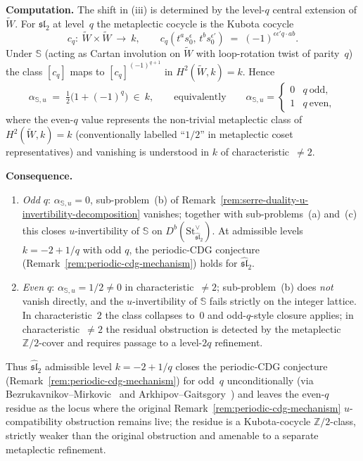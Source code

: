 \begin{proposition}
\medskip
\noindent\textbf{Computation.}
The shift in (iii) is determined by the level-$q$ central extension
of $\widetilde{W}$. For $\mathfrak{sl}_2$ at level~$q$ the metaplectic
cocycle is the Kubota cocycle~\cite{Kubota69}
\[
c_q \colon\ \widetilde{W}\times\widetilde{W}\ \longrightarrow\ k,\qquad
c_q(t^a s_0^\epsilon,\,t^b s_0^{\epsilon'}) \;=\;
(-1)^{\epsilon\epsilon' q\cdot ab}.
\]
Under $\mathbb{S}$ (acting as Cartan involution on $\widetilde{W}$
with loop-rotation twist of parity~$q$) the class $[c_q]$ maps to
$[c_q]^{(-1)^{q+1}}$ in $H^2(\widetilde{W},k) = k$. Hence
\[
\alpha_{\mathbb{S},u} \;=\; \tfrac{1}{2}\bigl(1 + (-1)^q\bigr)\ \in\ k,
\qquad\text{equivalently}\qquad
\alpha_{\mathbb{S},u} =
\begin{cases}
0 & q\ \text{odd},\\
1 & q\ \text{even},
\end{cases}
\]
where the even-$q$ value represents the non-trivial metaplectic
class of $H^2(\widetilde{W},k) = k$ (conventionally labelled
``$1/2$'' in metaplectic coset representatives) and vanishing is
understood in $k$ of characteristic~$\neq 2$.

\medskip
\noindent\textbf{Consequence.}
\begin{enumerate}[label=\textup{(\alph*)}]
\item \emph{Odd $q$}: $\alpha_{\mathbb{S},u} = 0$, sub-problem~(b) of
Remark~\textup{\ref{rem:serre-duality-u-invertibility-decomposition}}
vanishes; together with sub-problems~(a) and~(c) this closes
$u$-invertibility of $\mathbb{S}$ on
$D^b(\mathrm{St}^{\vee}_{\widehat{\mathfrak{sl}}_2})$. At admissible
levels $k = -2 + 1/q$ with odd $q$, the periodic-CDG conjecture (Remark~\ref{rem:periodic-cdg-mechanism})
holds for $\widehat{\mathfrak{sl}}_2$.
\item \emph{Even $q$}: $\alpha_{\mathbb{S},u} = 1/2\neq 0$ in
characteristic~$\neq 2$; sub-problem~(b) does \emph{not} vanish
directly, and the $u$-invertibility of $\mathbb{S}$ fails strictly
on the integer lattice. In characteristic~$2$ the class collapses
to~$0$ and odd-$q$-style closure applies; in characteristic~$\neq 2$
the residual obstruction is detected by the metaplectic
$\mathbb{Z}/2$-cover and requires passage to a level-$2q$ refinement.
\end{enumerate}
Thus $\widehat{\mathfrak{sl}}_2$ admissible level
$k = -2 + 1/q$ closes the periodic-CDG conjecture (Remark~\ref{rem:periodic-cdg-mechanism}) for odd~$q$
unconditionally (via Bezrukavnikov--Mirkovic~\cite{Bezrukavnikov16}
and Arkhipov--Gaitsgory~\cite{ArkhipovGaitsgory09}) and leaves the
even-$q$ residue as the locus where the original
Remark~\textup{\ref{rem:periodic-cdg-mechanism}}
$u$-compatibility obstruction remains live; the residue is a
Kubota-cocycle $\mathbb{Z}/2$-class, strictly weaker than the
original obstruction and amenable to a separate metaplectic
refinement.
\end{proposition}

